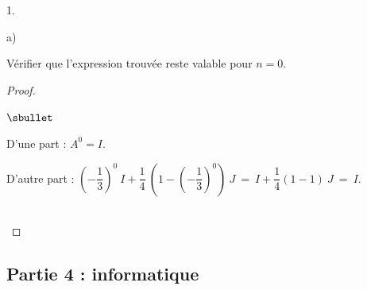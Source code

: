 \documentclass[11pt]{article}%
\begin{document}
\begin{noliste}{1.}
\begin{noliste}{a)}
  \item Vérifier que l'expression trouvée reste valable pour $n = 0$.

    \begin{proof}~%
      \begin{noliste}{$\sbullet$}
      \item D'une part : $A^0 = I$.
      \item D'autre part : $\left(-\dfrac{1}{3} \right)^{0} \ I +
        \dfrac{1}{4} \ \left( 1 - \left(-\dfrac{1}{3} \right)^{0}
        \right) \ J \ = \ I + \dfrac{1}{4} (1 - 1) \ J \ = \ I$.
      \end{noliste}
      ~\\[-1.2cm]
    \end{proof}
  \end{noliste}
\end{noliste}

\subsection*{Partie 4 : informatique}
\end{document}
